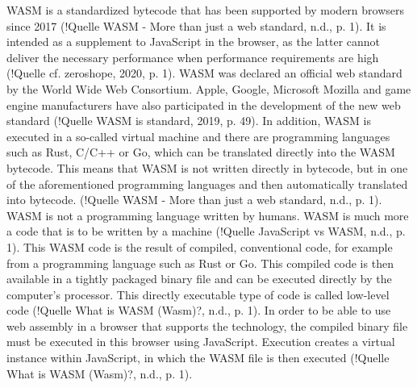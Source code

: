 WASM is a standardized bytecode that has been supported by modern browsers since 2017 (!Quelle WASM - More than just a web standard, n.d., p. 1). It is intended as a supplement to JavaScript in the browser, as the latter cannot deliver the necessary performance when performance requirements are high (!Quelle cf. zeroshope, 2020, p. 1).
WASM was declared an official web standard by the World Wide Web Consortium. Apple, Google, Microsoft Mozilla and game engine manufacturers have also participated in the development of the new web standard (!Quelle WASM is standard, 2019, p. 49).
In addition, WASM is executed in a so-called virtual machine and there are programming languages such as Rust, C/C++ or Go, which can be translated directly into the WASM bytecode. This means that WASM is not written directly in bytecode, but in one of the aforementioned programming languages and then automatically translated into bytecode. (!Quelle WASM - More than just a web standard, n.d., p. 1).
WASM is not a programming language written by humans. WASM is much more a code that is to be written by a machine (!Quelle JavaScript vs WASM, n.d., p. 1). This WASM code is the result of compiled, conventional code, for example from a programming language such as Rust or Go. This compiled code is then available in a tightly packaged binary file and can be executed directly by the computer's processor. This directly executable type of code is called low-level code (!Quelle What is WASM (Wasm)?, n.d., p. 1).
In order to be able to use web assembly in a browser that supports the technology, the compiled binary file must be executed in this browser using JavaScript. Execution creates a virtual instance within JavaScript, in which the WASM file is then executed (!Quelle What is WASM (Wasm)?, n.d., p. 1).
